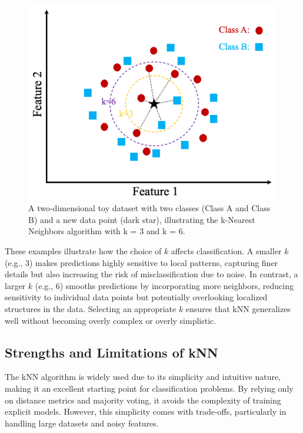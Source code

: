 \documentclass[
]{book}
\theoremstyle{definition}
\theoremstyle{definition}
\theoremstyle{definition}
\theoremstyle{definition}
\theoremstyle{remark}
\begin{document}
\begin{figure}

{\centering \includegraphics[width=0.75\linewidth]{images/knn} 

}

\caption{A two-dimensional toy dataset with two classes (Class A and Class B) and a new data point (dark star), illustrating the k-Nearest Neighbors algorithm with k = 3 and k = 6.}\label{fig:knn-image}
\end{figure}

These examples illustrate how the choice of \(k\) affects classification. A smaller \(k\) (e.g., 3) makes predictions highly sensitive to local patterns, capturing finer details but also increasing the risk of misclassification due to noise. In contrast, a larger \(k\) (e.g., 6) smooths predictions by incorporating more neighbors, reducing sensitivity to individual data points but potentially overlooking localized structures in the data. Selecting an appropriate \(k\) ensures that kNN generalizes well without becoming overly complex or overly simplistic.

\subsection*{Strengths and Limitations of kNN}\label{strengths-and-limitations-of-knn}

The kNN algorithm is widely used due to its simplicity and intuitive nature, making it an excellent starting point for classification problems. By relying only on distance metrics and majority voting, it avoids the complexity of training explicit models. However, this simplicity comes with trade-offs, particularly in handling large datasets and noisy features.
\end{document}
